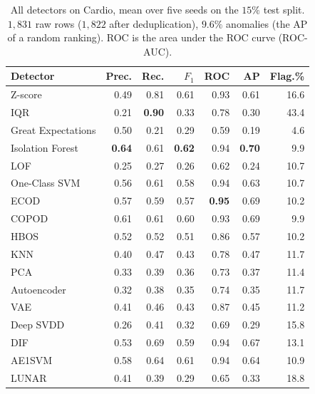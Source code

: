 \documentclass[conference]{IEEEtran}
\begin{document}
\begin{table}[t]
\caption{All detectors on Cardio, mean over five seeds on the $15\%$ test
split. $1{,}831$ raw rows ($1{,}822$ after deduplication), $9.6\%$ anomalies (the AP of a random ranking). ROC is the area under the ROC curve (ROC-AUC).}
\label{tab:cardio}
\centering
\setlength{\tabcolsep}{4pt}
\footnotesize
\begin{tabular}{lrrrrrr}
\toprule
Detector & Prec. & Rec. & $F_1$ & ROC & AP & Flag.\% \\
\midrule
Z-score            & 0.49 & 0.81 & 0.61 & 0.93 & 0.61 & 16.6 \\
IQR                & 0.21 & \textbf{0.90} & 0.33 & 0.78 & 0.30 & 43.4 \\
Great Expectations & 0.50 & 0.21 & 0.29 & 0.59 & 0.19 & 4.6 \\
\midrule
Isolation Forest   & \textbf{0.64} & 0.61 & \textbf{0.62} & 0.94 & \textbf{0.70} & 9.9 \\
LOF                & 0.25 & 0.27 & 0.26 & 0.62 & 0.24 & 10.7 \\
One-Class SVM      & 0.56 & 0.61 & 0.58 & 0.94 & 0.63 & 10.7 \\
ECOD               & 0.57 & 0.59 & 0.57 & \textbf{0.95} & 0.69 & 10.2 \\
COPOD              & 0.61 & 0.61 & 0.60 & 0.93 & 0.69 & 9.9 \\
HBOS               & 0.52 & 0.52 & 0.51 & 0.86 & 0.57 & 10.2 \\
KNN                & 0.40 & 0.47 & 0.43 & 0.78 & 0.47 & 11.7 \\
PCA                & 0.33 & 0.39 & 0.36 & 0.73 & 0.37 & 11.4 \\
\midrule
Autoencoder        & 0.32 & 0.38 & 0.35 & 0.74 & 0.35 & 11.7 \\
VAE                & 0.41 & 0.46 & 0.43 & 0.87 & 0.45 & 11.2 \\
Deep SVDD          & 0.26 & 0.41 & 0.32 & 0.69 & 0.29 & 15.8 \\
DIF                & 0.53 & 0.69 & 0.59 & 0.94 & 0.67 & 13.1 \\
AE1SVM             & 0.58 & 0.64 & 0.61 & 0.94 & 0.64 & 10.9 \\
LUNAR              & 0.41 & 0.39 & 0.29 & 0.65 & 0.33 & 18.8 \\
\bottomrule
\end{tabular}
\end{table}
\end{document}
